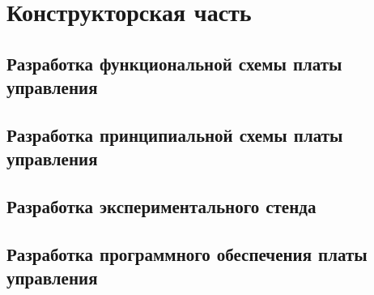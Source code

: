 \newpage
\section{Конструкторская часть}

\newpage
\subsection{Разработка функциональной схемы платы управления}

\newpage
\subsection{Разработка принципиальной схемы платы управления}

\newpage
\subsection{Разработка экспериментального стенда}


\newpage
\subsection{Разработка программного обеспечения платы управления}
